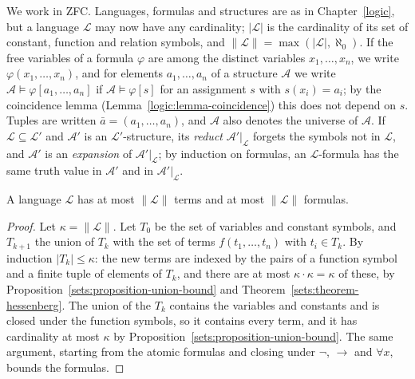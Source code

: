 \begin{notation}\label{model-theory:notation-conventions}
We work in ZFC. Languages, formulas and structures are as in Chapter~\ref{logic}, but a language $\mathcal{L}$ may now have any cardinality; $|\mathcal{L}|$
is the cardinality of its set of constant, function and relation symbols, and $\|\mathcal{L}\| = \max(|\mathcal{L}|, \aleph_0)$. If the free variables of a
formula $\varphi$ are among the distinct variables $x_1, \ldots, x_n$, we write $\varphi(x_1, \ldots, x_n)$, and for elements $a_1, \ldots, a_n$ of a structure
$\mathcal{A}$ we write $\mathcal{A} \models \varphi[a_1, \ldots, a_n]$ if $\mathcal{A} \models \varphi[s]$ for an assignment $s$ with $s(x_i) = a_i$; by the
coincidence lemma (Lemma~\ref{logic:lemma-coincidence}) this does not depend on $s$. Tuples are written $\bar{a} = (a_1, \ldots, a_n)$, and $\mathcal{A}$ also
denotes the universe of $\mathcal{A}$. If $\mathcal{L} \subseteq \mathcal{L}'$ and $\mathcal{A}'$ is an $\mathcal{L}'$-structure, its \emph{reduct}
$\mathcal{A}'|_{\mathcal{L}}$ forgets the symbols not in $\mathcal{L}$, and $\mathcal{A}'$ is an \emph{expansion} of $\mathcal{A}'|_{\mathcal{L}}$; by induction on
formulas, an $\mathcal{L}$-formula has the same truth value in $\mathcal{A}'$ and in $\mathcal{A}'|_{\mathcal{L}}$.
\end{notation}

\begin{lemma}\label{model-theory:lemma-counting-formulas}
A language $\mathcal{L}$ has at most $\|\mathcal{L}\|$ terms and at most $\|\mathcal{L}\|$ formulas.
\end{lemma}

\begin{proof}
Let $\kappa = \|\mathcal{L}\|$. Let $T_0$ be the set of variables and constant symbols, and $T_{k+1}$ the union of $T_k$ with the set of terms
$f(t_1, \ldots, t_n)$ with $t_i \in T_k$. By induction $|T_k| \leq \kappa$: the new terms are indexed by the pairs of a function symbol and a finite tuple
of elements of $T_k$, and there are at most $\kappa \cdot \kappa = \kappa$ of these, by Proposition~\ref{sets:proposition-union-bound} and
Theorem~\ref{sets:theorem-hessenberg}. The union of the $T_k$ contains the variables and constants and is closed under the function symbols, so it contains
every term, and it has cardinality at most $\kappa$ by Proposition~\ref{sets:proposition-union-bound}. The same argument, starting from the atomic formulas
and closing under $\neg$, $\to$ and $\forall x$, bounds the formulas.
\end{proof}

